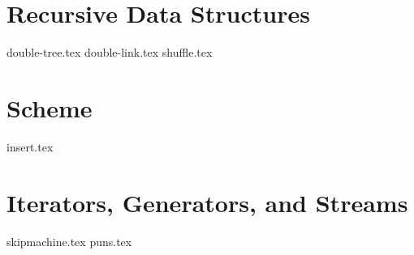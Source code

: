 \documentclass{exam}
\begin{document}
\newpage
\section{Recursive Data Structures}
\begin{questions}
{double-tree.tex}
\newpage
{double-link.tex}
{shuffle.tex}
\end{questions}

\newpage
\section{Scheme}
\begin{questions}
{insert.tex}
\end{questions}

\newpage
\section{Iterators, Generators, and Streams}
\begin{questions}
{skipmachine.tex}
\newpage
{puns.tex}
\end{questions}




\end{document}
